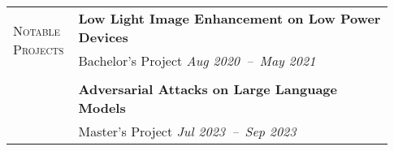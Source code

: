 \documentclass[letterpaper, 10pt, oneside]{article}
\newcommand{\stitle}[1]{\normalsize{\textsc{#1}}}
\newcommand{\bdit}[1]{{\textbf{#1}}}
\begin{document}
\begin{longtable}{@{} p{0.13\linewidth} p{0.8\linewidth}}
  \multirow{2}{6.5em}{\stitle{Notable Projects}}   & \bdit{Low Light Image Enhancement on Low Power Devices}                                                                                                             \\
  & Bachelor's Project \hfill \textsl{Aug 2020\ --\ May 2021}                                                                                   \\
\\
& \bdit{Adversarial Attacks on Large Language Models}\\
& Master's Project \hfill \textsl{Jul 2023\ --\ Sep 2023}
\end{longtable}
\end{document}
